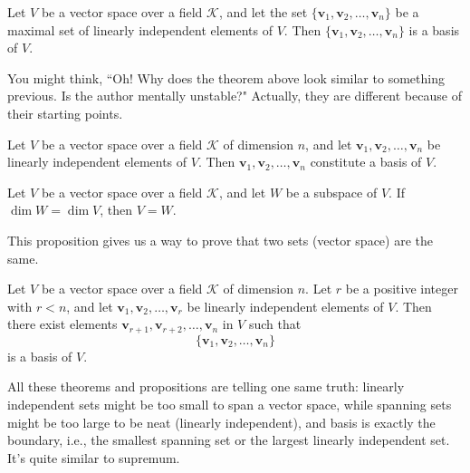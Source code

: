 \documentclass{ctexart}
\begin{document}
	\begin{mythm}
		Let $V$ be a vector space over a field $\mathcal{K}$, and let the set
		$\{\mathbf{v}_1, \mathbf{v}_2, \dots, \mathbf{v}_n\}$ be a maximal set of linearly independent elements of $V$.  
		Then $\{\mathbf{v}_1, \mathbf{v}_2, \dots, \mathbf{v}_n\}$ is a basis of $V$.
	\end{mythm}
	
	\begin{myrmk}
		You might think, ``Oh! Why does the theorem above look similar to something previous. Is the author mentally unstable?" Actually, they are different because of their starting points.
	\end{myrmk}
	
	\begin{mythm}
		Let $V$ be a vector space over a field $\mathcal{K}$ of dimension $n$, and let 
		$\mathbf{v}_1, \mathbf{v}_2, \dots, \mathbf{v}_n$ be linearly independent elements of $V$.  
		Then $\mathbf{v}_1, \mathbf{v}_2, \dots, \mathbf{v}_n$ constitute a basis of $V$.
	\end{mythm}
	
	\begin{mypro}
		Let $V$ be a vector space over a field $\mathcal{K}$, and let $W$ be a subspace of $V$.  
		If $\dim W = \dim V$, then $V = W$.
	\end{mypro}
	
	\begin{myrmk}
		This proposition gives us a way to prove that two sets (vector space) are the same.
	\end{myrmk}
	
	\begin{mypro}
		Let $V$ be a vector space over a field $\mathcal{K}$ of dimension $n$.  
		Let $r$ be a positive integer with $r < n$, and let 
		$\mathbf{v}_1, \mathbf{v}_2, \dots, \mathbf{v}_r$ be linearly independent elements of $V$.  
		Then there exist elements $\mathbf{v}_{r+1}, \mathbf{v}_{r+2}, \dots, \mathbf{v}_n$ in $V$ such that
		\[
		\{\mathbf{v}_1, \mathbf{v}_2, \dots, \mathbf{v}_n\}
		\]
		is a basis of $V$.
	\end{mypro}
	
	\begin{myrmk}
		All these theorems and propositions are telling one same truth: linearly independent sets might be too small to span a vector space, while spanning sets might be too large to be neat (linearly independent), and basis is exactly the boundary, i.e., the smallest spanning set or the largest linearly independent set. It's quite similar to supremum.
	\end{myrmk}
	
\end{document}
